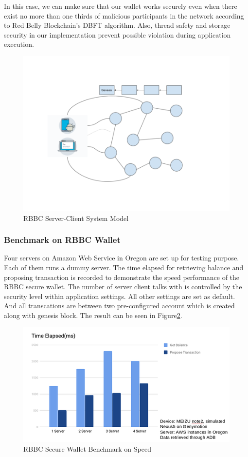 \documentclass[12pt]{article}
\begin{document}
In this case, we can make sure that our wallet works securely even when there exist no more than one thirds of malicious participants in the network according to Red Belly Blockchain's DBFT algorithm. Also, thread safety and storage security in our implementation prevent possible violation during application execution.

\begin{figure}
    \centering
    \includegraphics{server_client.png}
    \caption{RBBC Server-Client System Model}
    \label{fig:server_client}
\end{figure}

\subsubsection{Benchmark on RBBC Wallet}

Four servers on Amazon Web Service in Oregon are set up for testing purpose. Each of them runs a dummy server. The time elapsed for retrieving balance and proposing transaction is recorded to demonstrate the speed performance of the RBBC secure wallet. The number of server client talks with is controlled by the security level within application settings. All other settings are set as default. And all transcations are between two pre-configured account which is created along with genesis block. The result can be seen in Figure\ref{fig:benchmark}.

\begin{figure}
   \includegraphics{benchmark.png}
   \caption{RBBC Secure Wallet Benchmark on Speed}
   \label{fig:benchmark} 
\end{figure}
\end{document}
